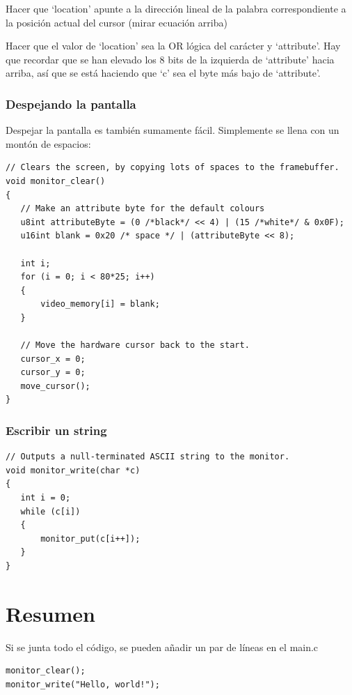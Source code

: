 \documentclass{report}
\begin{document}
Hacer que ‘location’ apunte a la direcci\'{o}n lineal de la palabra correspondiente a la posici\'{o}n actual del cursor (mirar ecuaci\'{o}n arriba)

Hacer que el valor de ‘location’ sea la OR l\'{o}gica del car\'{a}cter y ‘attribute’. Hay que recordar que se han elevado los 8 bits de la izquierda de ‘attribute’ hacia arriba, as\'{i} que se est\'{a} haciendo que ‘c’ sea el byte m\'{a}s bajo de ‘attribute’.

\subsubsection{Despejando la pantalla}

Despejar la pantalla es tambi\'{e}n sumamente f\'{a}cil. Simplemente se llena con un mont\'{o}n de espacios:

\begin{lstlisting}
// Clears the screen, by copying lots of spaces to the framebuffer.
void monitor_clear()
{
   // Make an attribute byte for the default colours
   u8int attributeByte = (0 /*black*/ << 4) | (15 /*white*/ & 0x0F);
   u16int blank = 0x20 /* space */ | (attributeByte << 8);

   int i;
   for (i = 0; i < 80*25; i++)
   {
       video_memory[i] = blank;
   }

   // Move the hardware cursor back to the start.
   cursor_x = 0;
   cursor_y = 0;
   move_cursor();
}
\end{lstlisting}

\subsubsection{Escribir un string}

\begin{lstlisting}
// Outputs a null-terminated ASCII string to the monitor.
void monitor_write(char *c)
{
   int i = 0;
   while (c[i])
   {
       monitor_put(c[i++]);
   }
}
\end{lstlisting}

\section{Resumen}

Si se junta todo el c\'{o}digo, se pueden añadir un par de l\'{i}neas en el main.c

\begin{lstlisting}
monitor_clear();
monitor_write("Hello, world!");
\end{lstlisting}
\end{document}
